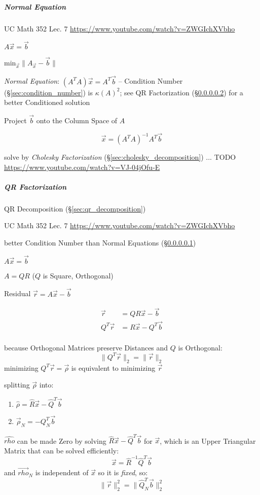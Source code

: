 \subparagraph{Normal Equation}\label{sec:normal_equation}\hfill

UC Math 352 Lec. 7 \url{https://www.youtube.com/watch?v=ZWGIchXVbho}

$A\vec{x} = \vec{b}$

$\mathrm{min}_{\vec{x}} \|A_{\vec{x}} - \vec{b}\|$

\emph{Normal Equation}: $(A^TA)\vec{x} = A^T\vec{b}$ -- Condition Number
(\S\ref{sec:condition_number}) is $\kappa(A)^2$; see QR Factorization
(\S\ref{sec:qr_factorization}) for a better Conditioned solution

Project $\vec{b}$ onto the Column Space of $A$

\[
  \vec{x} = (A^TA)^{-1}A^T\vec{b}
\]

solve by \emph{Cholesky Factorization} (\S\ref{sec:cholesky_decomposition}) ...
TODO \url{https://www.youtube.com/watch?v=VJ-04jOfu-E}



\subparagraph{QR Factorization}\label{sec:qr_factorization}\hfill

QR Decomposition (\S\ref{sec:qr_decomposition})

UC Math 352 Lec. 7 \url{https://www.youtube.com/watch?v=ZWGIchXVbho}

better Condition Number than Normal Equations (\S\ref{sec:normal_equation})

$A\vec{x} = \vec{b}$

$A = QR$ ($Q$ is Square, Orthogonal)

Residual $\vec{r} = A\vec{x} - \vec{b}$

\begin{align*}
     \vec{r} & = QR\vec{x} - \vec{b} \\
  Q^T\vec{r} & = R\vec{x} - Q^T\vec{b} \\
\end{align*}

because Orthogonal Matrices preserve Distances and $Q$ is Orthogonal:
\[
  \|Q^T\vec{r}\|_2 = \|\vec{r}\|_2
\]
minimizing $Q^T\vec{r} = \vec{\rho}$ is equivalent to minimizing $\vec{r}$

splitting $\vec{\rho}$ into:
\begin{enumerate}
  \item $\hat{\rho}   = \hat{R}\vec{x} - \hat{Q}^T\vec{b}$
  \item $\vec{\rho}_N = -Q_N^T\vec{b}$
\end{enumerate}
$\hat{rho}$ can be made Zero by solving $\hat{R}\vec{x} - \hat{Q}^T\vec{b}$ for
$\vec{x}$, which is an Upper Triangular Matrix that can be solved efficiently:
\[
  \hat{\vec{x}} = \hat{R}^{-1}\hat{Q}^T\vec{b}
\]
and $\vec{rho}_N$ is independent of $\vec{x}$ so it is \emph{fixed}, so:
\[
  \|\vec{r}\|^2_2 = \|\hat{Q}_N^T\vec{b}\|_2^2
\]



